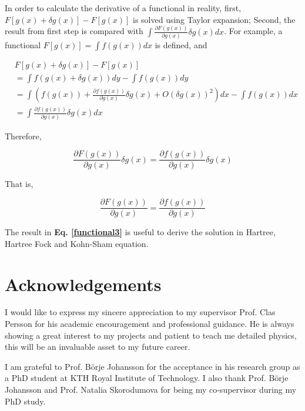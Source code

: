 \documentclass[a4paper, 12pt, titlepage,oneside,drop]{kthesis}
\begin{document}
In order to calculate the derivative of a functional in reality, first, $F[g(x) + \delta g(x)] - F[g(x)]$ is solved using Taylor expansion; 
Second, the result from first step is compared with $\int \frac{\partial F(g(x))}{\partial g(x)} \delta g(x) dx $. For example, a functional $F[g(x)] = \int f(g(x)) dx$  is defined, and  

\begin{equation}
\begin{split}
& F[g(x) + \delta g(x)] - F[g(x)] \\
& = \int f(g(x)+\delta g(x)) dy - \int f(g(x))dy \\
& = \int ( f(g(x))+ \frac{\partial f(g(x))}{\partial g(x)} \delta g(x) + O(\delta g(x))^2)dx - \int f(g(x))dx \\
& = \int \frac{\partial f(g(x))}{\partial g(x)} \delta g(x) dx
\end{split}
\end{equation}

Therefore, 

\begin{equation}
\frac{\partial F(g(x))}{\partial g(x)} \delta g(x) = \frac{\partial f(g(x))}{\partial g(x)} \delta g(x)
\end{equation}

That is, 

\begin{equation} \label{functional3}
\frac{\partial F(g(x))}{\partial g(x)} = \frac{\partial f(g(x))}{\partial g(x)}
\end{equation}

The result in \textbf{Eq. \ref{functional3}} is useful to derive the solution in Hartree, Hartree Fock and Kohn-Sham equation.


\chapter*{Acknowledgements} 

I would like to express my sincere appreciation to my supervisor Prof. Clas Persson for his academic encouragement and professional guidance. He is always showing a great interest to my projects and patient to teach me detailed
physics, this will be an invaluable asset to my future career.

I am grateful to Prof. Börje Johansson for the acceptance in his research group as a PhD student at KTH Royal Institute of Technology. I also thank Prof. Börje Johansson and Prof. Natalia Skorodumova for being my co-supervisor during my PhD study.
\end{document}
